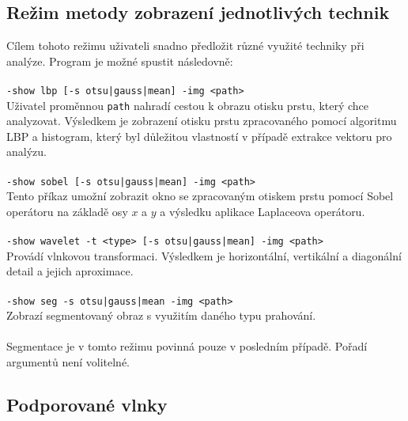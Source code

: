 \subsection*{Režim metody zobrazení jednotlivých technik}
Cílem tohoto režimu uživateli snadno předložit různé využité techniky při analýze. Program je možné spustit následovně:\\\\
\verb=-show lbp [-s otsu|gauss|mean] -img <path>=\\
Uživatel proměnnou \verb=path= nahradí cestou k obrazu otisku prstu, který chce analyzovat. Výsledkem je zobrazení otisku prstu zpracovaného pomocí algoritmu LBP a histogram, který byl důležitou vlastností v případě extrakce vektoru pro analýzu.\\\\
\verb=-show sobel [-s otsu|gauss|mean] -img <path>=\\
Tento příkaz umožní zobrazit okno se zpracovaným otiskem prstu pomocí Sobel operátoru na základě osy $x$ a $y$ a výsledku aplikace Laplaceova operátoru.\\\\
\verb=-show wavelet -t <type> [-s otsu|gauss|mean] -img <path>=\\
Provádí vlnkovou transformaci. Výsledkem je horizontální, vertikální a diagonální detail a jejich aproximace.\\\\
\verb=-show seg -s otsu|gauss|mean -img <path>=\\
Zobrazí segmentovaný obraz s využitím daného typu prahování.\\\\
Segmentace je v tomto režimu povinná pouze v posledním případě. Pořadí argumentů není volitelné.

\subsection*{Podporované vlnky}

